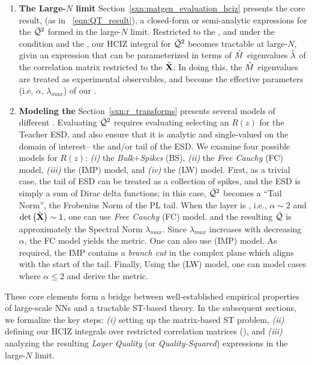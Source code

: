 \begin{enumerate}[label=5.\arabic*]
\item
\textbf{The Large-$N$ limit}
Section~\ref{sxn:matgen_evaluation_hciz} presents the core result,
(as in \EQN~\ref{eqn:QT_result}),
a closed-form or semi-analytic expressions for the \LayerQualitySquared $\bar{\mathcal{Q}}^{2}$
formed in the large-$N$ limit.
Restricted to the \ECS, and under  the \TRACELOG condition and the \IFA, our
HCIZ integral for $\bar{\mathcal{Q}}^{2}$ becomes tractable at large-$N$, givin an expression that can be parameterized
in terms of $\tilde{M}$ eigenvalues $\tilde{\lambda}$ of the \Teacher correlation matrix 
restricted to the \ECS $\tilde{\mathbf{X}}$.
In doing this, the $\tilde{M}$ \Teacher eigenvalues are treated as experimental observables, and 
become the effective \SemiEmpirical parameters (i.e, $\alpha$, $\lambda_{max}$) of our \SETOL.

\item
\textbf{Modeling the \HeavyTailed \RTransform}
Section~\ref{sxn:r_transforms} presents several  models of different \RTransforms.
Evaluating $\bar{\mathcal{Q}}^{2}$ requires evaluating selecting an \RTransform $R(z)$ for the Teacher ESD,
and also ensure that it is analytic and single-valued on the domain of interest-- the \ECS and/or tail of the ESD.
We examine four possible models for $R(z)$: \emph{(i)} the \emph{Bulk$+$Spikes} (BS),
\emph{(ii)} the \emph{Free Cauchy} (FC) model, 
\emph{(iii)} the \emph{\InverseMP} (IMP) model, 
and \emph{(iv)} the  \LevyWigner (LW) model.
First, as a trivial case, the tail of ESD can be treated as a collection of spikes,
and the ESD is simply a sum of Dirac delta functions; in this case,
$\bar{\mathcal{Q}}^{2}$ becomes a ``Tail Norm'', the Frobenius Norm of the PL tail.
When the layer is \Ideal, i.e., $\alpha\sim 2$ and $\mbox{}{\text{det}}\left(\tilde{\mathbf{X}}\right)\sim 1$,
one can use  \emph{Free Cauchy} (FC) model.  and the resulting \LayerQuality $\bar{\mathcal{Q}}$
is approximately the Spectral Norm $\lambda_{max}$.
Since $\lambda_{max}$ increases with decreasing $\alpha$, the FC model yields the \HTSR \ALPHA metric.
One can also use  \emph{\InverseMP} (IMP) model. 
As required, the IMP \RTransform contains a \emph{branch cut} in the complex plane
which aligns with the start of the \ECS \PowerLaw tail.
Finally, Using the \LevyWigner (LW) model, one can model cases where
$\alpha\le 2$ and derive the \HTSR \ALPHAHAT metric.
\end{enumerate}

\vspace*{1em}

These core elements form a bridge between well-established empirical properties of large-scale NNs 
and a tractable ST-based theory. In the subsequent sections, we formalize the key steps: 
\emph{(i)} setting up the matrix-based ST problem, \emph{(ii)} defining our HCIZ integrals 
over restricted correlation matrices (\ECS), and \emph{(iii)} analyzing the resulting 
\emph{Layer Quality} (or \emph{Quality-Squared}) expressions in the large-$N$ limit.
